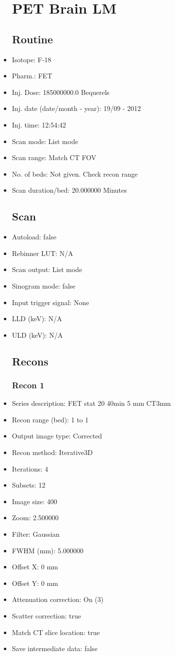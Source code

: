 \documentclass[12pt]{article}
\begin{document}
\begin{itemize}
\section{PET Brain LM}\subsection{Routine}
\item Isotope: F-18
\item Pharm.: FET
\item Inj. Dose: 185000000.0 Bequerels
\item Inj. date (date/month - year): 19/09 - 2012
\item Inj. time: 12:54:42
\item Scan mode: List mode
\item Scan range: Match CT FOV
\item No. of beds: Not given. Check recon range
\item Scan duration/bed: 20.000000 Minutes
\subsection{Scan}
\item Autoload: false
\item Rebinner LUT: N/A
\item Scan output: List mode
\item Sinogram mode: false
\item Input trigger signal: None
\item LLD (keV): N/A
\item ULD (keV): N/A
\subsection{Recons}
\subsubsection{Recon 1}
\item Series description: FET stat 20 40min 5 mm CT3mm
\item Recon range (bed): 1 to 1
\item Output image type: Corrected
\item Recon method: Iterative3D
\item Iterations: 4
\item Subsets: 12
\item Image size: 400
\item Zoom: 2.500000
\item Filter: Gaussian
\item FWHM (mm): 5.000000
\item Offset X: 0 mm
\item Offset Y: 0 mm
\item Attenuation correction: On (3)
\item Scatter correction: true
\item Match CT slice location: true
\item Save intermediate data: false

\end{itemize}
\end{document}
